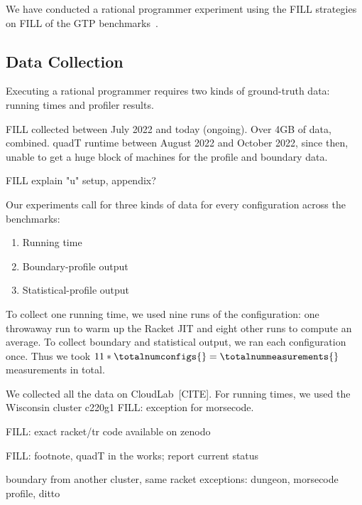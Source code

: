 \newcommand{\numgtp}{}
\newcommand{\boundaryMB}{527}
\newcommand{\statisticalMB}{4010}
\newcommand{\runtimeMB}{44}



We have conducted a rational programmer experiment
using the FILL strategies
on FILL of the GTP benchmarks~\cite{}.


\subsection{Data Collection}

Executing a rational programmer requires two kinds of ground-truth data:
running times and profiler results.

FILL collected between July 2022 and today (ongoing).
Over 4GB of data, combined.
quadT runtime between August 2022 and October 2022, since then, unable to get a huge
block of machines for the profile and boundary data.




FILL explain "u" setup, appendix?



Our experiments call for three kinds of data for every configuration across the benchmarks:
\begin{enumerate}
  \item Running time
  \item Boundary-profile output
  \item Statistical-profile output
\end{enumerate}

To collect one running time, we used nine runs of the configuration:
one throwaway run to warm up the Racket JIT and eight other runs to compute an average.
To collect boundary and statistical output, we ran each configuration once.
Thus we took $11 * \totalnumconfigs{} = \totalnummeasurements{}$ measurements in total.

We collected all the data on CloudLab~[CITE].
For running times, we used the Wisconsin cluster c220g1 
FILL: exception for morsecode.

FILL: exact racket/tr code available on zenodo

FILL: footnote, quadT in the works; report current status

boundary from another cluster, same racket
exceptions: dungeon, morsecode
profile, ditto

